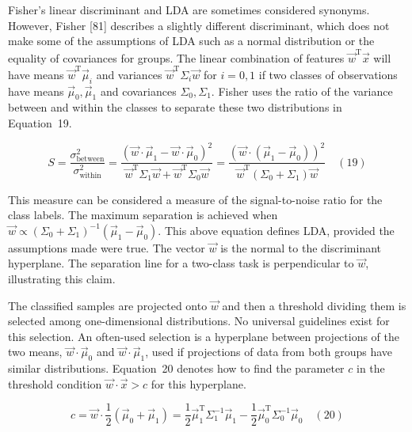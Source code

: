 \documentclass[preprint,12pt]{elsarticle}
\begin{document}
Fisher's linear discriminant and LDA are sometimes considered synonyms. However, Fisher [81] describes a slightly different discriminant, which does not make some of the assumptions of LDA such as a normal distribution or the equality of covariances for groups. The linear combination of features ${\vec{w}}^{\mathrm{T}}{\vec{x}}$ will have means ${\vec{w}}^{\mathrm{T}}{\vec{\mu}}_{i}$ and variances ${\vec{w}}^{\mathrm{T}}\Sigma_{i}{\vec{w}}$ for $i=0,1$ if two classes of observations have means ${\vec{\mu}}_{0},{\vec{\mu}}_{1}$ and covariances $\Sigma_{0},\Sigma_{1}$. Fisher uses the ratio of the variance between and within the classes to separate these two distributions in Equation~19.

\begin{equation}
	S={\frac{\sigma_{\text{between}}^{2}}{\sigma_{\text{within}}^{2}}}={\frac{({\vec{w}}\cdot{\vec{\mu}}_{1}-{\vec{w}}\cdot {\vec{\mu}}_{0})^{2}}{{\vec{w}}^{\mathrm{T}}\Sigma_{1}{\vec{w}}+{\vec{w}}^{\mathrm{T}}\Sigma_{0}{\vec{w}}}}={\frac{({\vec{w}}\cdot ({\vec{\mu}}_{1}-{\vec{\mu}}_{0}))^{2}}{{\vec{w}}^{\mathrm{T}}(\Sigma_{0}+\Sigma_{1}){\vec{w}}}}
	\quad\left(19\right)
\end{equation}

This measure can be considered a measure of the signal-to-noise ratio for the class labels. The maximum separation is achieved when ${\vec{w}}\propto\left(\Sigma_{0}+\Sigma_{1}\right)^{-1}\left({\vec{\mu}}_{1}-{\vec{\mu}}_{0}\right)$. This above equation defines LDA, provided the assumptions made were true.
The vector  $\vec{w}$ is the normal to the discriminant hyperplane. The separation line for a two-class task is perpendicular to $\vec{w}$, illustrating this claim.

The classified samples are projected onto $\vec{w}$ and then a threshold dividing them is selected among one-dimensional distributions. No universal guidelines exist for this selection. An often-used selection is a hyperplane between projections of the two means, ${\vec{w}}\cdot {\vec{\mu}}_{0}$ and $ \vec{w} \cdot {\vec{\mu}}_{1}$, used if projections of data from both groups have similar distributions. 
Equation~20 denotes how to find the parameter $c$ in the threshold condition ${\vec{w}}\cdot {\vec{x}} > c$ for this hyperplane.

\begin{equation}
	c={\vec{w}}\cdot {\frac{1}{2}}({\vec{\mu}}_{0}+{\vec{\mu}}_{1})={\frac{1}{2}}{\vec{\mu}}_{1}^{\mathrm{T}}\Sigma_{1}^{-1}{\vec{\mu}}_{1}-{\frac{1}{2}}{\vec{\mu}}_{0}^{\mathrm{T}}\Sigma_{0}^{-1}{\vec{\mu}}_{0}
	\quad\left(20\right)
\end{equation}
\end{document}
